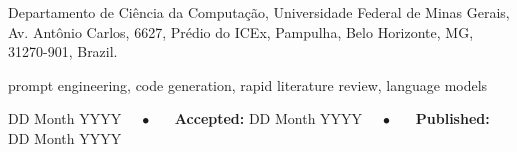 \documentclass[english]{sbcreviews-2025}
\title[Prompt Engineering for Software Coding and Implementation]{\titulotccen}
\begin{document}
\begin{frontmatter}

\maketitle

\begin{mail}
Departamento de Ciência da Computação, Universidade Federal de Minas Gerais, Av. Antônio Carlos, 6627, Prédio do ICEx, Pampulha, Belo Horizonte, MG, 31270-901, Brazil.
\end{mail}

\begin{abstract-en}

\end{abstract-en}

\begin{keywords}
prompt engineering, code generation, rapid literature review, language models
\end{keywords}

\begin{dates}
 DD Month YYYY~~~$\bullet$~~~
{\sffamily\textbf{Accepted:}} DD Month YYYY~~~$\bullet$~~~
{\sffamily\textbf{Published:}} DD Month YYYY
\end{dates}

\end{frontmatter}















\end{document}
